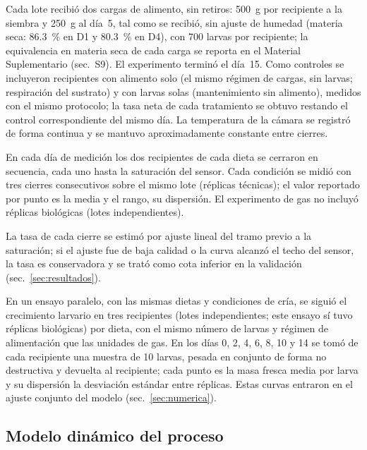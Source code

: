 Cada lote recibió dos cargas de alimento, sin retiros: 500~g por recipiente a la siembra y 250~g al día~5, tal como se recibió, sin ajuste de humedad (materia seca: 86.3~\% en D1 y 80.3~\% en D4), con 700 larvas por recipiente; la equivalencia en materia seca de cada carga se reporta en el Material Suplementario (sec.~S9). El experimento terminó el día~15. Como controles se incluyeron recipientes con alimento solo (el mismo régimen de cargas, sin larvas; respiración del sustrato) y con larvas solas (mantenimiento sin alimento), medidos con el mismo protocolo; la tasa neta de cada tratamiento se obtuvo restando el control correspondiente del mismo día. La temperatura de la cámara se registró de forma continua y se mantuvo aproximadamente constante entre cierres.

En cada día de medición los dos recipientes de cada dieta se cerraron en secuencia, cada uno hasta la saturación del sensor. Cada condición se midió con tres cierres consecutivos sobre el mismo lote (réplicas técnicas); el valor reportado por punto es la media y el rango, su dispersión. El experimento de gas no incluyó réplicas biológicas (lotes independientes).

La tasa de cada cierre se estimó por ajuste lineal del tramo previo a la saturación; si el ajuste fue de baja calidad o la curva alcanzó el techo del sensor, la tasa es conservadora y se trató como cota inferior en la validación (sec.~\ref{sec:resultados}).

En un ensayo paralelo, con las mismas dietas y condiciones de cría, se siguió el crecimiento larvario en tres recipientes (lotes independientes; este ensayo sí tuvo réplicas biológicas) por dieta, con el mismo número de larvas y régimen de alimentación que las unidades de gas. En los días 0, 2, 4, 6, 8, 10 y 14 se tomó de cada recipiente una muestra de 10 larvas, pesada en conjunto de forma no destructiva y devuelta al recipiente; cada punto es la masa fresca media por larva y su dispersión la desviación estándar entre réplicas. Estas curvas entraron en el ajuste conjunto del modelo (sec.~\ref{sec:numerica}).

\subsection{Modelo dinámico del proceso}
\label{sec:modelo}

